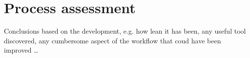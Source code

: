 \section{Process assessment}

Conclusions based on the development, e.g. how lean it has been, any useful tool discovered, any cumbersome aspect of the workflow that coud have been improved \dots